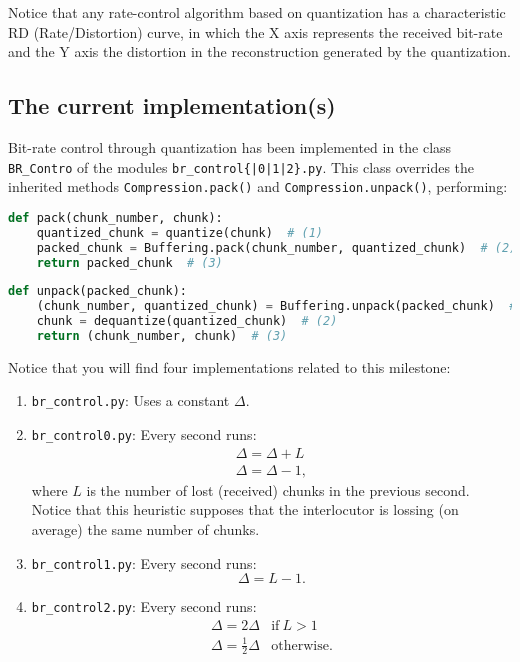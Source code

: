 Notice that any rate-control algorithm based on quantization has a
characteristic RD (Rate/Distortion) curve, in which the X axis
represents the received bit-rate and the Y axis the distortion in the
reconstruction generated by the quantization.

\subsection{The current implementation(s)}

Bit-rate control through quantization has been implemented in the
class \verb|BR_Contro| of the modules
\texttt{br\_control\{|0|1|2\}.py}. This class overrides the inherited
methods \verb|Compression.pack()| and \verb|Compression.unpack()|,
performing:

\begin{lstlisting}[language=Python]
  def pack(chunk_number, chunk):
    quantized_chunk = quantize(chunk)  # (1)
    packed_chunk = Buffering.pack(chunk_number, quantized_chunk)  # (2)
    return packed_chunk  # (3)
\end{lstlisting}

\begin{lstlisting}[language=Python]
  def unpack(packed_chunk):
    (chunk_number, quantized_chunk) = Buffering.unpack(packed_chunk)  # (1)
    chunk = dequantize(quantized_chunk)  # (2)
    return (chunk_number, chunk)  # (3)
\end{lstlisting}

Notice that you will find four implementations related to this milestone:
\begin{enumerate}
\item \verb|br_control.py|: Uses a constant $\Delta$.
\item \verb|br_control0.py|: Every second runs:
  \begin{equation}
    \begin{array}{l}
      \Delta = \Delta + L \\
      \Delta = \Delta - 1,
    \end{array}
  \end{equation}
  where $L$ is the number of lost (received) chunks in the previous
  second. Notice that this heuristic supposes that the interlocutor is
  lossing (on average) the same number of chunks.
\item \verb|br_control1.py|: Every second runs:
  \begin{equation}
    \Delta = L - 1.
  \end{equation}
\item \verb|br_control2.py|: Every second runs:
  \begin{equation}
    \begin{array}{ll}
      \Delta = 2\Delta & \text{if}~L>1 \\
      \Delta = \frac{1}{2}\Delta & \text{otherwise}.
    \end{array}
  \end{equation}
\end{enumerate}

